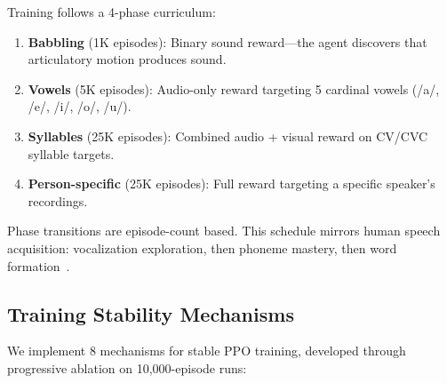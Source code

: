 \documentclass[11pt, a4paper]{article}
\begin{document}
Training follows a 4-phase curriculum:

\begin{enumerate}
    \item \textbf{Babbling} (1K episodes): Binary sound reward---the agent discovers that articulatory motion produces sound.
    \item \textbf{Vowels} (5K episodes): Audio-only reward targeting 5 cardinal vowels (/a/, /e/, /i/, /o/, /u/).
    \item \textbf{Syllables} (25K episodes): Combined audio + visual reward on CV/CVC syllable targets.
    \item \textbf{Person-specific} (25K episodes): Full reward targeting a specific speaker's recordings.
\end{enumerate}

Phase transitions are episode-count based. This schedule mirrors human speech acquisition: vocalization exploration, then phoneme mastery, then word formation~\cite{kubicek2019articulatory}.

\subsection{Training Stability Mechanisms}
\label{sec:training_stability}

We implement 8 mechanisms for stable PPO training, developed through progressive ablation on 10,000-episode runs:
\end{document}
